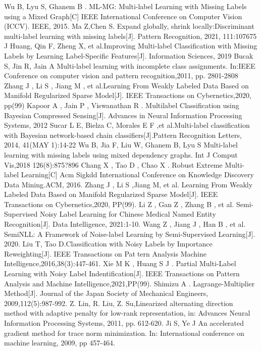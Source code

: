 \documentclass[final,3p,times]{elsarticle}
\begin{document}
{         Wu B, Lyu S, Ghanem B . ML-MG: Multi-label Learning with Missing Labels using a Mixed Graph[C] IEEE International Conference on Computer Vision (ICCV). IEEE, 2015.
         Ma Z,Chen S. Expand globally, shrink locally:Discriminant multi-label learning with missing labels[J]. Pattern Recognition, 2021, 111:107675
         J Huang, Qin F, Zheng X, et al.Improving Multi-label Classification with Missing Labels by Learning Label-Specific Features[J]. Information Sciences, 2019
         Bucak S, Jin R, Jain A Multi-label learning with incomplete class assignments. In:IEEE Conference on computer vision and pattern recognition,2011, pp. 2801-2808
         Zhang J , Li S , Jiang M , et al.Learning From Weakly Labeled Data Based on Manifold Regularized Sparse Model[J]. IEEE Transactions on Cybernetics,2020, pp(99)
         Kapoor A , Jain P , Viswanathan R . Multilabel Classification using Bayesian Compressed Sensing[J]. Advances in Neural Information Processing Systems, 2012 
         Sucar L E, Bielza C, Morales E F ,et al.Multi-label classification with Bayesian network-based chain classifiers[J].Pattern Recognition Letters, 2014, 41(MAY 1):14-22
         Wu B, Jia F, Liu W, Ghanem B, Lyu S Multi-label learning with missing labels using mixed dependency graphs. Int J Comput Vis,2018 126(8):875?896
         Chang X , Tao D , Chao X . Robust Extreme Multi-label Learning[C] Acm Sigkdd International Conference on Knowledge Discovery Data Mining.ACM, 2016.
         Zhang J , Li S ,Jiang M, et al. Learning From Weakly Labeled Data Based on Manifold Regularized Sparse Model[J]. IEEE Transactions on Cybernetics,2020, PP(99).
         Li Z , Gan Z , Zhang B , et al. Semi-Supervised Noisy Label Learning for Chinese Medical Named Entity Recognition[J]. Data Intelligence, 2021:1-10.
         Wang Z , Jiang J , Han B , et al. SemiNLL: A Framework of Noise-label Learning by Semi-Supervised Learning[J]. 2020.
         Liu T, Tao D.Classification with Noisy Labels by Importance Reweighting[J]. IEEE Transactions on Pattern Analysis Machine Intelligence,2016,38(3):447-461.
         Xie M K , Huang S J . Partial Multi-Label Learning with Noisy Label Indentification[J]. IEEE Transactions on Pattern Analysis and Machine Intelligence,2021,PP(99).
         Shimizu A . Lagrange-Multiplier Method[J]. Journal of the Japan Society of Mechanical Engineers, 2009,112(5):987-992.
         Z. Lin, R. Liu, Z. Su,Linearized alternating direction method with adaptive penalty for low-rank representation, in: Advances Neural Information Processing Systems, 2011, pp. 612-620.
         Ji S, Ye J An accelerated gradient method for trace norm minimization. In: International conference on machine learning, 2009, pp 457-464.
}
\end{document}

